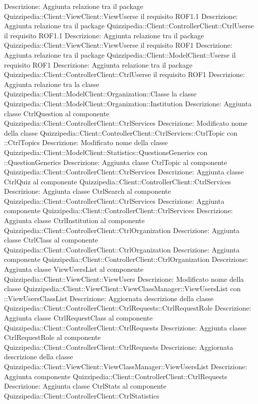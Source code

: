 Descrizione: Aggiunta relazione tra il package Quizzipedia::Client::ViewClient::ViewUserse il requisito ROF1.1 
Descrizione: Aggiunta relazione tra il package Quizzipedia::Client::ControllerClient::CtrlUserse il requisito ROF1.1 
Descrizione: Aggiunta relazione tra il package Quizzipedia::Client::ViewClient::ViewUserse il requisito ROF1 
Descrizione: Aggiunta relazione tra il package Quizzipedia::Client::ModelClient::Userse il requisito ROF1 
Descrizione: Aggiunta relazione tra il package Quizzipedia::Client::ControllerClient::CtrlUserse il requisito ROF1 
Descrizione: Aggiunta relazione tra la classe Quizzipedia::Client::ModelClient::Organization::Classe la classe Quizzipedia::Client::ModelClient::Organization::Institution 
Descrizione: Aggiunta classe CtrlQuestion al componente Quizzipedia::Client::ControllerClient::CtrlServices 
Descrizione: Modificato nome della classe Quizzipedia::Client::ControllerClient::CtrlServices::CtrlTopic con ::CtrlTopics 
Descrizione: Modificato nome della classe Quizzipedia::Client::ModelClient::Statistics::QuestionsGenerics con ::QuestionGenerics 
Descrizione: Aggiunta classe CtrlTopic al componente Quizzipedia::Client::ControllerClient::CtrlServices 
Descrizione: Aggiunta classe CtrlQuiz al componente Quizzipedia::Client::ControllerClient::CtrlServices 
Descrizione: Aggiunta classe CtrlSearch al componente Quizzipedia::Client::ControllerClient::CtrlServices 
Descrizione: Aggiunta componente Quizzipedia::Client::ControllerClient::CtrlServices 
Descrizione: Aggiunta classe CtrlInstitution al componente Quizzipedia::Client::ControllerClient::CtrlOrganization 
Descrizione: Aggiunta classe CtrlClass al componente Quizzipedia::Client::ControllerClient::CtrlOrganization 
Descrizione: Aggiunta componente Quizzipedia::Client::ControllerClient::CtrlOrganization 
Descrizione: Aggiunta classe ViewUsersList al componente Quizzipedia::Client::ViewClient::ViewUsers 
Descrizione: Modificato nome della classe Quizzipedia::Client::ViewClient::ViewClassManager::ViewUsersList con ::ViewUsersClassList 
Descrizione: Aggiornata descrizione della classe Quizzipedia::Client::ControllerClient::CtrlRequests::CtrlRequestRole 
Descrizione: Aggiunta classe CtrlRequestClass al componente Quizzipedia::Client::ControllerClient::CtrlRequests 
Descrizione: Aggiunta classe CtrlRequestRole al componente Quizzipedia::Client::ControllerClient::CtrlRequests 
Descrizione: Aggiornata descrizione della classe Quizzipedia::Client::ViewClient::ViewClassManager::ViewUsersList 
Descrizione: Aggiunta componente Quizzipedia::Client::ControllerClient::CtrlRequests 
Descrizione: Aggiunta classe CtrlStats al componente Quizzipedia::Client::ControllerClient::CtrlStatistics 
